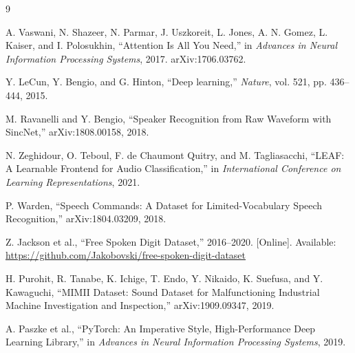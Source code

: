\documentclass[10pt,twocolumn]{article}
\begin{document}
\small
\begin{thebibliography}{9}

A. Vaswani, N. Shazeer, N. Parmar, J. Uszkoreit, L. Jones, A. N. Gomez,
L. Kaiser, and I. Polosukhin,
``Attention Is All You Need,'' in \emph{Advances in Neural Information
Processing Systems}, 2017. arXiv:1706.03762.

Y. LeCun, Y. Bengio, and G. Hinton,
``Deep learning,'' \emph{Nature}, vol. 521, pp. 436--444, 2015.

M. Ravanelli and Y. Bengio,
``Speaker Recognition from Raw Waveform with SincNet,''
arXiv:1808.00158, 2018.

N. Zeghidour, O. Teboul, F. de Chaumont Quitry, and M. Tagliasacchi,
``LEAF: A Learnable Frontend for Audio Classification,''
in \emph{International Conference on Learning Representations}, 2021.

P. Warden,
``Speech Commands: A Dataset for Limited-Vocabulary Speech Recognition,''
arXiv:1804.03209, 2018.

Z. Jackson et al.,
``Free Spoken Digit Dataset,'' 2016--2020. [Online]. Available:
\url{https://github.com/Jakobovski/free-spoken-digit-dataset}

H. Purohit, R. Tanabe, K. Ichige, T. Endo, Y. Nikaido, K. Suefusa, and
Y. Kawaguchi,
``MIMII Dataset: Sound Dataset for Malfunctioning Industrial Machine
Investigation and Inspection,'' arXiv:1909.09347, 2019.

A. Paszke et al.,
``PyTorch: An Imperative Style, High-Performance Deep Learning Library,''
in \emph{Advances in Neural Information Processing Systems}, 2019.

\end{thebibliography}
\end{document}
